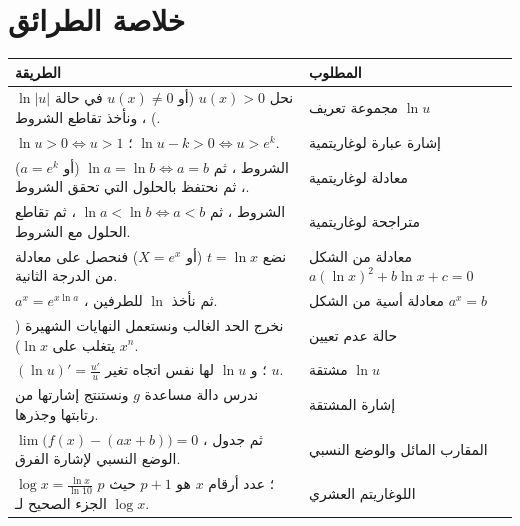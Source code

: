 \documentclass[12pt,a4paper]{article}
\begin{document}
\section{خلاصة الطرائق}
\begin{center}
\begin{tabular}{|p{}|p{}|}\hline
\rowcolor{cSec!12}\textbf{الطريقة} & \textbf{المطلوب}\\\hline
نحل $u(x)>0$ (أو $u(x)\neq0$ في حالة $\ln|u|$) ، ونأخذ تقاطع الشروط. & مجموعة تعريف $\ln u$\\\hline
$\ln u>0\iff u>1$ ؛ $\ln u-k>0\iff u>e^{k}$. & إشارة عبارة لوغاريتمية\\\hline
الشروط ، ثم $\ln a=\ln b\iff a=b$ (أو $a=e^{k}$) ، ثم نحتفظ بالحلول التي تحقق الشروط. & معادلة لوغاريتمية\\\hline
الشروط ، ثم $\ln a<\ln b\iff a<b$ ، ثم تقاطع الحلول مع الشروط. & متراجحة لوغاريتمية\\\hline
نضع $t=\ln x$ (أو $X=e^{x}$) فنحصل على معادلة من الدرجة الثانية. & معادلة من الشكل $a(\ln x)^{2}+b\ln x+c=0$\\\hline
$a^{x}=e^{x\ln a}$ ، ثم نأخذ $\ln$ للطرفين. & معادلة أسية من الشكل $a^{x}=b$\\\hline
نخرج الحد الغالب ونستعمل النهايات الشهيرة ($x^{n}$ يتغلب على $\ln x$). & حالة عدم تعيين\\\hline
$\left(\ln u\right)'=\frac{u'}{u}$ ؛ و $\ln u$ لها نفس اتجاه تغير $u$. & مشتقة $\ln u$\\\hline
ندرس دالة مساعدة $g$ ونستنتج إشارتها من رتابتها وجذرها. & إشارة المشتقة\\\hline
$\lim\big(f(x)-(ax+b)\big)=0$ ، ثم جدول الوضع النسبي لإشارة الفرق. & المقارب المائل والوضع النسبي\\\hline
$\log x=\frac{\ln x}{\ln10}$ ؛ عدد أرقام $x$ هو $p+1$ حيث $p$ الجزء الصحيح لـ $\log x$. & اللوغاريتم العشري\\\hline
\end{tabular}
\end{center}
\end{document}

